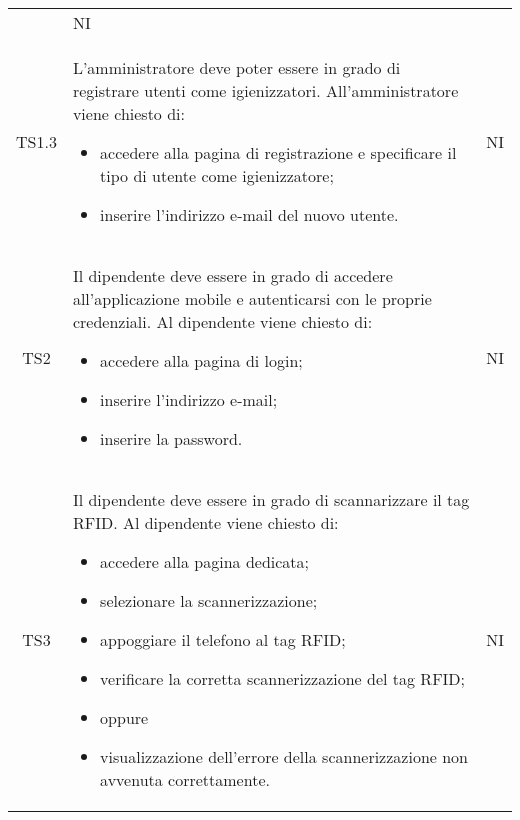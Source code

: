 {\begin{longtable}{ c C{11cm} c }
\begin{itemize}
        \end{itemize}&
        NI\\

        TS1.3&
        \begin{flushleft}
            L'amministratore deve poter essere in grado di registrare utenti come igienizzatori.
            All'amministratore viene chiesto di:
        \end{flushleft}
        \begin{itemize}
            \item accedere alla pagina di registrazione e specificare il tipo di utente come igienizzatore;
            \item inserire l'indirizzo e-mail del nuovo utente.
            
        \end{itemize}&
        NI\\

        TS2&
        \begin{flushleft}
             Il dipendente deve essere in grado di accedere all'applicazione mobile e autenticarsi con le proprie credenziali.
             Al dipendente viene chiesto di:
        \end{flushleft}
        \begin{itemize}
            \item accedere alla pagina di login;
            \item inserire l'indirizzo e-mail;
            \item inserire la password.
        \end{itemize}&
        NI\\

        TS3&
        \begin{flushleft}
            Il dipendente deve essere in grado di scannarizzare il tag RFID.
            Al dipendente viene chiesto di:
        \end{flushleft}
        \begin{itemize}
            \item accedere alla pagina dedicata;
            \item selezionare la scannerizzazione;
            \item appoggiare il telefono al tag RFID;
            \item verificare la corretta scannerizzazione del tag RFID;
            \item [] oppure
            \item visualizzazione dell'errore della scannerizzazione non avvenuta correttamente.
        \end{itemize}&
        NI\\


\end{longtable}}
